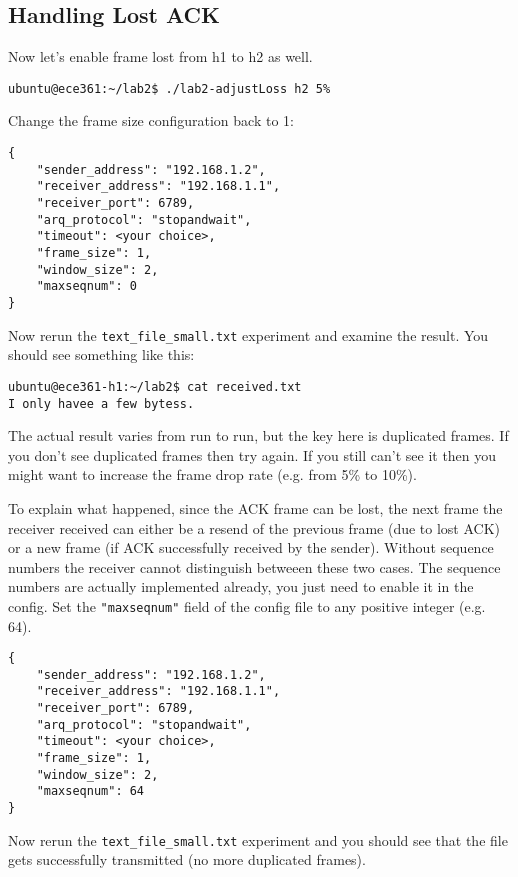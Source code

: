 \documentclass[11pt]{article}
\begin{document}
\subsection {Handling Lost ACK}
Now let's enable frame lost from h1 to h2 as well.
\begin{lstlisting}[style=ece361-shell-base, caption={}]
ubuntu@ece361:~/lab2$ ./lab2-adjustLoss h2 5%
\end{lstlisting}

Change the frame size configuration back to 1:
\begin{lstlisting}[style=ece361-shell-base, caption={Configuration For Large File}]
{
    "sender_address": "192.168.1.2",
    "receiver_address": "192.168.1.1",
    "receiver_port": 6789,
    "arq_protocol": "stopandwait",
    "timeout": <your choice>,
    "frame_size": 1,
    "window_size": 2,
    "maxseqnum": 0
}
\end{lstlisting}
Now rerun the \texttt{text\_file\_small.txt} experiment and examine the result. You should see something like this:

\begin{lstlisting}[style=ece361-shell-base, caption={}]
ubuntu@ece361-h1:~/lab2$ cat received.txt
I only havee a few bytess.
\end{lstlisting}
The actual result varies from run to run, but the key here is duplicated frames.
If you don't see duplicated frames then try again. If you still can't see it then you might want to increase the frame drop rate (e.g. from 5\% to 10\%).

To explain what happened, since the ACK frame can be lost, the next frame the receiver received can either be a resend of the previous frame (due to lost ACK) or a new frame (if ACK successfully received by the sender).
Without sequence numbers the receiver cannot distinguish betweeen these two cases.
The sequence numbers are actually implemented already, you just need to enable it in the config.
Set the \texttt{"maxseqnum"} field of the config file to any positive integer (e.g. 64).

\begin{lstlisting}[style=ece361-shell-base, caption={Configuration For Large File}]
{
    "sender_address": "192.168.1.2",
    "receiver_address": "192.168.1.1",
    "receiver_port": 6789,
    "arq_protocol": "stopandwait",
    "timeout": <your choice>,
    "frame_size": 1,
    "window_size": 2,
    "maxseqnum": 64
}
\end{lstlisting}

Now rerun the \texttt{text\_file\_small.txt} experiment and you should see that the file gets successfully transmitted (no more duplicated frames).
\end{document}
